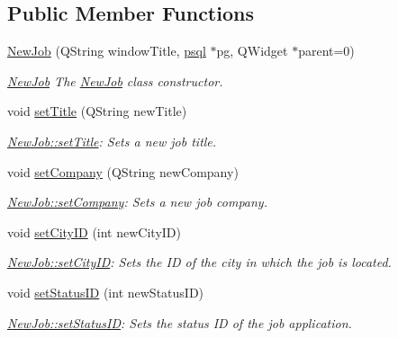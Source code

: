 \subsection*{Public Member Functions}
\begin{DoxyCompactItemize}
\item 
\hyperlink{class_new_job_a489279a9ec91bcac74d7dad65eb2f85a}{New\+Job} (Q\+String window\+Title, \hyperlink{classpsql}{psql} $\ast$pg, Q\+Widget $\ast$parent=0)
\begin{DoxyCompactList}\small\item\em \hyperlink{class_new_job}{New\+Job} The \hyperlink{class_new_job}{New\+Job} class constructor. \end{DoxyCompactList}\item 
void \hyperlink{class_new_job_ae8c2b576f2ea6f444776e6d944f0d767}{set\+Title} (Q\+String new\+Title)
\begin{DoxyCompactList}\small\item\em \hyperlink{class_new_job_ae8c2b576f2ea6f444776e6d944f0d767}{New\+Job\+::set\+Title}\+: Sets a new job title. \end{DoxyCompactList}\item 
void \hyperlink{class_new_job_ad9f522f4a6a45348ecc3ab1229b5eabb}{set\+Company} (Q\+String new\+Company)
\begin{DoxyCompactList}\small\item\em \hyperlink{class_new_job_ad9f522f4a6a45348ecc3ab1229b5eabb}{New\+Job\+::set\+Company}\+: Sets a new job company. \end{DoxyCompactList}\item 
void \hyperlink{class_new_job_a715852b239121af2b12ce36eded8faa0}{set\+City\+ID} (int new\+City\+ID)
\begin{DoxyCompactList}\small\item\em \hyperlink{class_new_job_a715852b239121af2b12ce36eded8faa0}{New\+Job\+::set\+City\+ID}\+: Sets the ID of the city in which the job is located. \end{DoxyCompactList}\item 
void \hyperlink{class_new_job_aa184d2046d0e60e82cd5840c40b99bed}{set\+Status\+ID} (int new\+Status\+ID)
\begin{DoxyCompactList}\small\item\em \hyperlink{class_new_job_aa184d2046d0e60e82cd5840c40b99bed}{New\+Job\+::set\+Status\+ID}\+: Sets the status ID of the job application. \end{DoxyCompactList}\item 

\end{DoxyCompactItemize}
